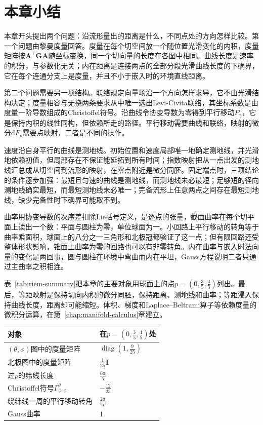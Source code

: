 \section{本章小结}
\label{sec:riem-summary}

本章开头提出两个问题：沿流形量出的距离是什么，不同点处的方向怎样比较。第一个问题由黎曼度量回答。度量在每个切空间放一个随位置光滑变化的内积，度量矩阵按$\bm A^\top\bm G\bm A$随坐标变换，同一个切向量的长度在各图中相同。曲线长度是速率的积分，与参数化无关；内在距离是连接两点的全部分段光滑曲线长度的下确界，它在每个连通分支上是度量，并且不小于嵌入时的环境直线距离。

第二个问题需要另一项结构。联络规定向量场沿一个方向怎样求导，它不由光滑结构决定；度量相容与无挠两条要求从中唯一选出Levi-Civita联络，其坐标系数是由度量一阶导数组成的Christoffel符号。沿曲线令协变导数为零得到平行移动$P_\gamma$，它是保持内积的线性同构，但依赖所走的路径。平行移动需要曲线和联络，映射的微分$\mathrm dF_p$需要点映射，二者是不同的操作。

速度沿自身平行的曲线是测地线。初始位置和速度局部唯一地确定测地线，并光滑地依赖初值，但局部存在不保证能延拓到所有时间；指数映射把从一点出发的测地线汇总成从切空间到流形的映射，在零点附近是微分同胚。固定端点时，三项结论的条件逐步加强：最短且匀速的曲线是测地线，而测地线未必最短；足够短的径向测地线确实最短，而最短测地线未必唯一；完备流形上任意两点之间存在最短测地线，缺少完备性时下确界可能取不到。

曲率用协变导数的次序差扣除Lie括号定义，是逐点的张量，截面曲率在每个切平面上读出一个数：平面与圆柱为零，单位球面为一。小回路上平行移动的转角等于曲率乘面积，球面上的八分之一三角形和北极冠都验证了这一点；但有限回路还受整体形状影响，锥面上曲率为零的回路也可以有非零转角。内在曲率与嵌入时法向量的变化是两回事，圆与圆柱在环境中弯曲而内在平坦，Gauss方程说明二者只通过主曲率之积相连。

表~\ref{tab:riem-summary}把本章的主要对象用球面上的点$p=(0,\tfrac35,\tfrac45)$列出。最后，等距映射是保持切向内积的微分同胚，保持距离、测地线和曲率；等距浸入保持曲线长度，距离却可能缩短。体积、梯度和Laplace--Beltrami算子等依赖度量的微积分运算，在第~\ref{chap:manifold-calculus}章建立。

\begin{BookInlineTable}
  \centering
  \begin{tabular}{ll}
    \toprule
    对象 & 在$p=(0,\tfrac35,\tfrac45)$处\\
    \midrule
    $(\theta,\phi)$图中的度量矩阵 & $\operatorname{diag}(1,\tfrac9{25})$\\
    北极图中的度量矩阵 & $\tfrac1{25}\bm I$\\
    过$p$的纬线长度 & $\tfrac{6\pi}5$\\
    Christoffel符号$\Gamma^\theta_{\phi,\phi}$ & $-\tfrac{12}{25}$\\
    绕纬线一周的平行移动转角 & $\tfrac{2\pi}5$\\
    Gauss曲率 & $1$\\
    \bottomrule
  \end{tabular}
  \caption{本章主要对象在球面点$p$处的取值。}
  \label{tab:riem-summary}
\end{BookInlineTable}
